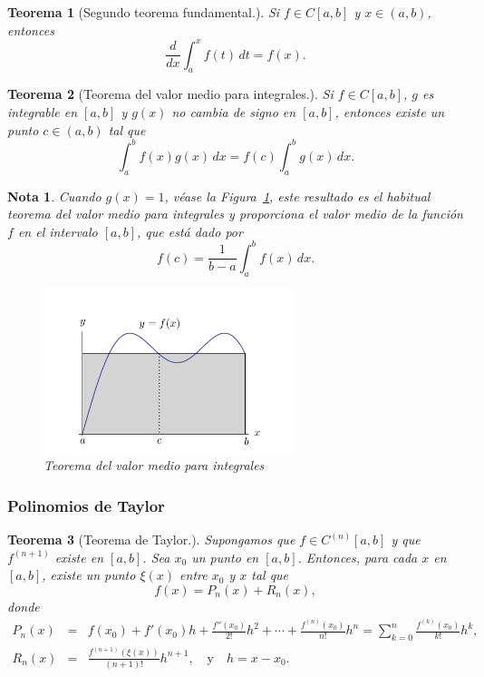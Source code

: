 \documentclass[12pt]{article}
\newtheorem{Note}{Nota}%
\newtheorem{Teo}{Teorema}
\begin{document}
\begin{Teo}[Segundo teorema fundamental.]
  Si $f \in C[a, b] $ y $x \in (a, b) $, entonces $$\frac{d}{dx} \int_a^x f(t) \, dt = f(x).$$
\end{Teo}

\begin{Teo}[Teorema del valor medio para integrales.]
  Si $f \in C[a, b] $, $g $ es integrable en $[a, b] $ y $g(x) $ no cambia de signo en $[a, b] $, entonces existe un punto $c \in (a, b) $ tal que  $$\int_a^b f(x)g(x) \, dx = f(c) \int_a^b g(x) \, dx.$$
\end{Teo}

\begin{Note}
Cuando $g(x) = 1 $, véase la Figura~\ref{fig:valormedio-integral}, este resultado es el habitual teorema del valor medio para integrales y proporciona el valor medio de la función $f $ en el intervalo $[a, b] $, que está dado por $$f(c) = \frac{1}{b-a} \int_a^b f(x) \, dx.$$

\begin{figure}[H]
\centering
\includegraphics[width=0.65\textwidth]{Fig4.png}
\caption{Teorema del valor medio para integrales}
\label{fig:valormedio-integral}
\end{figure}
\end{Note}

\subsubsection{Polinomios de Taylor}

\begin{Teo}[Teorema de Taylor.]
Supongamos que $f \in C^{(n)}[a,b] $ y que $f^{(n+1)} $ existe en $[a,b] $. Sea $x_0 $ un punto en $[a,b] $. Entonces, para cada $x $ en $[a,b] $, existe un punto $\xi(x) $ entre $x_0 $ y $x $ tal que
$$f(x) = P_n(x) + R_n(x),$$
donde
\begin{eqnarray}
P_n(x) &=& f(x_0) + f'(x_0)h + \frac{f''(x_0)}{2!}h^2 + \cdots + \frac{f^{(n)}(x_0)}{n!}h^n = \sum_{k=0}^n \frac{f^{(k)}(x_0)}{k!} h^k,\\
R_n(x)&=& \frac{f^{(n+1)}(\xi(x))}{(n+1)!} h^{n+1}, \quad \text{y} \quad h = x - x_0.
\end{eqnarray}
\end{Teo}
\end{document}
